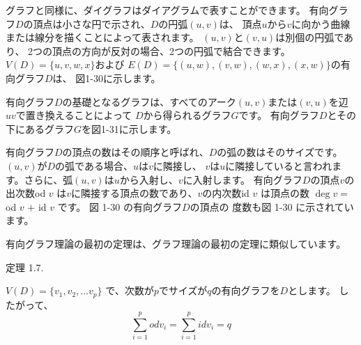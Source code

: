 
グラフと同様に、ダイグラフはダイアグラムで表すことができます。
有向グラフ$D$の頂点は小さな円で示され、$D$の円弧$(u, v)$は、
頂点$u$から$v$に向かう曲線または線分を描くことによって表されます。
$(u, v)$と$(v, u)$は別個の円弧であり、
2つの頂点の方向が反対の場合、2つの円弧で結合できます。 
$V(D) = \{u, v, w, x\}$および $E(D) = \{(u,w), (v, w), (w, x), (x, w)\}$の有向グラフ$D$は、 
図1-30に示します。

有向グラフ$D$の基礎となるグラフは、すべてのアーク$(u, v)$または$(v, u)$を辺$uv$で置き換えることによって
$D$から得られるグラフ$G$です。 有向グラフ$D$とその下にあるグラフ$G$を図1-31に示します。

有向グラフ$D$の頂点の数はその順序と呼ばれ、$D$の弧の数はそのサイズです。$(u, v)$が$D$の弧である場合、$u$は$v$に隣接し、
$v$は$u$に隣接していると言われます。さらに、弧$(u, v)$は$u$から入射し、$v$に入射します。
有向グラフ$D$の頂点$v$の出次数od $v$ は$v$に隣接する頂点の数であり、$v$の内次数id $v$ は頂点の数 $\deg v = $od $v$ $+$ id $v$ です。 図 1-30 の有向グラフ$D$の頂点の
度数も図 1-30 に示されています。

有向グラフ理論の最初の定理は、グラフ理論の最初の定理に類似しています。

定理 1.7. 

$V(D) = \{v_1, v_2, \dots v_p\}$ で、次数が$p$でサイズが$q$の有向グラフを$D$とします。
したがって、$$ \sum_{i = 1}^{p} od v_i = \sum_{i = 1}^{p} id v_i = q$$